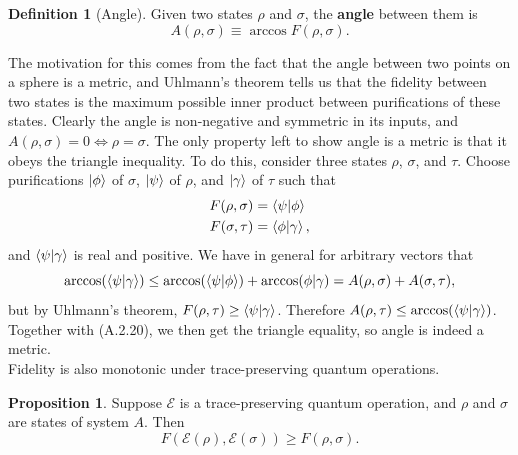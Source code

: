 \documentclass[12pt,a4paper]{report}
\numberwithin{equation}{section}
\theoremstyle{definition}
\newtheorem{definition}{Definition}[section]
\theoremstyle{theorem}
\theoremstyle{theorem}
\theoremstyle{example}
\newtheorem{proposition}{Proposition}
\theoremstyle{definition}
\begin{document}
\begin{definition}[Angle]
	Given two states $\rho$ and $\sigma$, the \textbf{angle} between them is
	\begin{equation}
		A(\rho,\sigma)\equiv\arccos F(\rho,\sigma).
	\end{equation}
\end{definition}
The motivation for this comes from the fact that the angle between two points on a sphere is a metric, and Uhlmann's theorem tells us that the fidelity between two states is the maximum possible inner product between purifications of these states. Clearly the angle is non-negative and symmetric in its inputs, and $A(\rho,\sigma)=0\iff\rho=\sigma$. The only property left to show angle is a metric is that it obeys the triangle inequality. To do this, consider three states $\rho$, $\sigma$, and $\tau$. Choose purifications $\ket{\phi}$ of $\sigma$, $\ket{\psi}$ of $\rho$, and $\ket{\gamma}$ of $\tau$ such that
\begin{equation}
	\begin{aligned}
		F(\rho,\sigma)&=\braket{\psi|\phi}\\
		F(\sigma,\tau)&=\braket{\phi|\gamma},
	\end{aligned}
\end{equation}
and $\braket{\psi|\gamma}$ is real and positive. We have in general for arbitrary vectors that
\begin{equation}
	\arccos(\braket{\psi|\gamma})\leq\arccos(\braket{\psi|\phi})+\arccos({\phi|\gamma})=A(\rho,\sigma)+A(\sigma,\tau),
\end{equation}
but by Uhlmann's theorem, $F(\rho,\tau)\geq\braket{\psi|\gamma}$. Therefore $A(\rho,\tau)\leq\arccos(\braket{\psi|\gamma})$. Together with (A.2.20), we then get the triangle equality, so angle is indeed a metric.\\
Fidelity is also monotonic under trace-preserving quantum operations.
\begin{proposition}
	Suppose $\mathcal{E}$ is a trace-preserving quantum operation, and $\rho$ and $\sigma$ are states of system $A$. Then
	\begin{equation}
		F(\mathcal{E}(\rho),\mathcal{E}(\sigma))\geq F(\rho,\sigma).
	\end{equation}
\end{proposition} 
\end{document}

